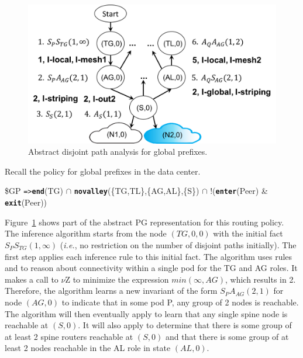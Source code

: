 \documentclass[numbers, 10pt, preprint]{sigplanconf}
\newcommand{\IE}{\emph{i.e.}}
\newcommand{\KW}[1]{\texttt{\small\bfseries{#1}}}
\newcommand{\Path}{\texttt{=>}}
\newcommand{\Exit}{\KW{exit}}
\newcommand{\End}{\KW{end}}
\newcommand{\Enter}{\KW{enter}}
\newcommand{\Novalley}{\KW{novalley}}
\begin{document}
\begin{figure}
  \begin{center}
    \includegraphics[width=\columnwidth]{figures/analysis}
  \end{center}
  \vspace{-1em}
  \caption{Abstract disjoint path analysis for global prefixes. \label{fig:compilation-times}}
  \label{fig:example-inference}
  \vspace{-.8em}
\end{figure}

Recall the policy for global prefixes in the data center.
%
\begin{code}
\$GP \Path \End(TG) \ensuremath{\cap}
       \Novalley(\{TG,TL\},\{AG,AL\},\{S\}) \ensuremath{\cap}
       !(\Enter(Peer) & \Exit(Peer))
\end{code}
\noindent
%
Figure~\ref{fig:example-inference} shows part of the abstract PG representation for this routing policy. The inference algorithm starts from the node $(TG,0,0)$ with the initial fact $S_P S_{TG}(1,\infty)$ (\IE, no restriction on the number of disjoint paths initially).
%
The first step applies each inference rule to this initial fact. The algorithm uses rules  and  to reason about connectivity within a single pod for the TG and AG roles. It makes a call to $\nu$Z to minimize the expression $min(\infty, AG)$, which results in 2. Therefore, the algorithm learns a new invariant of the form $S_P A_{AG} (2,1)$ for node $(AG, 0)$ to indicate that in some pod P, any group of 2 nodes is reachable.
%
The algorithm will then eventually apply  to learn that any single spine node is reachable at $(S,0)$. It will also apply  to determine that there is some group of at least 2 spine routers reachable at $(S,0)$ and that there is some group of at least 2 nodes reachable in the AL role in state $(AL,0)$.
\end{document}
